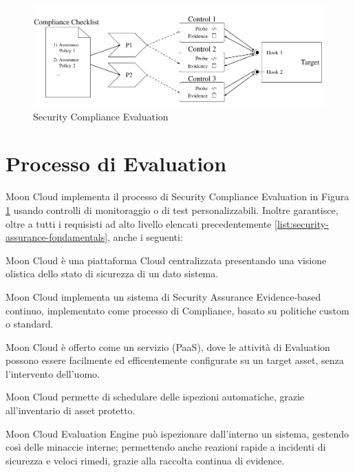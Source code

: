 \begin{figure}
	\includegraphics[scale=0.5]{images/Security_Compliance_Evaluation.PNG}
	\caption{Security Compliance Evaluation}
	\label{fig:Security_Compliance_Evaluation}
\end{figure}

\newpage

\section{Processo di Evaluation}
Moon Cloud implementa il processo di Security Compliance Evaluation in Figura \ref{fig:Security_Compliance_Evaluation} usando controlli 
di monitoraggio o di test personalizzabili. Inoltre garantisce, oltre a tutti i requisisti ad alto livello elencati precedentemente 
\ref{list:security-assurance-fondamentals}, anche i seguenti:
\begin{description}
	\item Moon Cloud è una piattaforma Cloud centralizzata presentando una visione olistica dello stato di sicurezza di un dato sistema.
	\item Moon Cloud implementa un sistema di Security Assurance Evidence-based continuo, implementato come processo di Compliance,
	basato su politiche custom o standard.
	\item Moon Cloud è offerto come un servizio (PaaS), dove le attività di Evaluation possono essere facilmente ed efficentemente 
	configurate su un target asset, senza l'intervento dell'uomo.
	\item Moon Cloud permette di schedulare delle ispezioni automatiche, grazie all'inventario di asset protetto.
	\item Moon Cloud Evaluation Engine può ispezionare dall'interno un sistema, gestendo così delle minaccie interne; permettendo anche 
	reazioni rapide a incidenti di sicurezza e veloci rimedi, grazie alla raccolta continua di evidence. 
\end{description}


